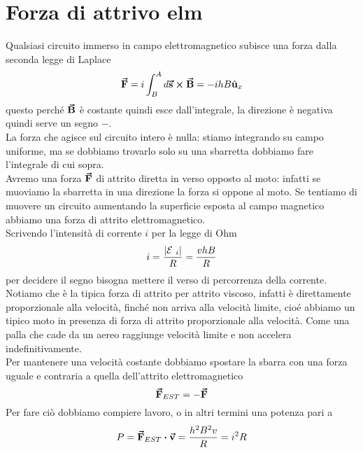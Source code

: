 \section{Forza di attrivo elm}
Qualsiasi circuito immerso in campo elettromagnetico subisce una forza dalla seconda legge di Laplace
\begin{equation*}
	\vb*{\va{F}}=i\int_B^A d\vb*{\va{s}}\cross\vb*{\va{B}}=-ihB\hat{\mathbf{u}}_x
\end{equation*}
questo perché $\vb*{\va{B}}$ è costante quindi esce dall'integrale, la direzione è negativa quindi serve un segno $-$.\\
La forza che agisce sul circuito intero è nulla: stiamo integrando su campo uniforme, ma se dobbiamo trovarlo solo su una sbarretta dobbiamo fare l'integrale di cui sopra.\\
Avremo una forza $\vb*{\va{F}}$ di attrito diretta in verso opposto al moto: infatti se muoviamo la sbarretta in una direzione la forza si oppone al moto.
Se tentiamo di muovere un circuito aumentando la superficie esposta al campo magnetico abbiamo una forza di attrito elettromagnetico.\\

Scrivendo l'intensità di corrente $i$ per la legge di Ohm
\begin{gather*}
	i=\frac{\abs{\mathcal{E}\ _i}}{R}=\frac{vhB}{R}
\end{gather*}
per decidere il segno bisogna mettere il verso di percorrenza della corrente.\\
Notiamo che è la tipica forza di attrito per attrito viscoso, infatti è direttamente proporzionale alla velocità, finché non arriva alla velocità limite, cioé abbiamo un tipico moto in presenza di forza di attrito proporzionale alla velocità. Come una palla che cade da un aereo raggiunge velocità limite e non accelera indefinitivamente.\\
Per mantenere una velocità costante dobbiamo spostare la sbarra con una forza uguale e contraria a quella dell'attrito elettromagnetico
\begin{equation*}
	\vb*{\va{F}}_{EST}=-\vb*{\va{F}}
\end{equation*}
Per fare ciò dobbiamo compiere lavoro, o in altri termini una potenza pari a 
\begin{equation}
	P=\vba F_{EST}\vdot\vba v=\frac{h^2B^2v}{R}=i^2R
\end{equation}

